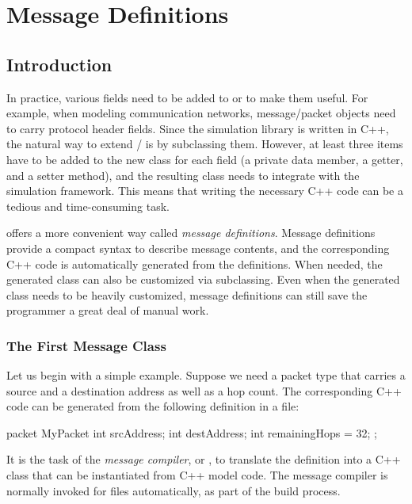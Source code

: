 \chapter{Message Definitions}
\label{cha:msg-def}


\section{Introduction}
\label{sec:msg-defs:intro}

In practice, various fields need to be added to  or
 to make them useful. For example, when modeling
communication networks, message/packet objects need to carry protocol
header fields. Since the simulation library is written in C++, the natural
way to extend / is by subclassing
them. However, at least three items have to be added to the new class for
each field (a private data member, a getter, and a setter method), and the
resulting class needs to integrate with the simulation framework. This
means that writing the necessary C++ code can be a tedious and
time-consuming task.

{\opp} offers a more convenient way called \textit{message definitions}.
Message definitions provide a compact syntax to describe message contents,
and the corresponding C++ code is automatically generated from the
definitions. When needed, the generated class can also be customized via
subclassing. Even when the generated class needs to be heavily customized,
message definitions can still save the programmer a great deal of manual
work.


\subsection{The First Message Class}
\label{sec:msg-defs:first-msg-class}

Let us begin with a simple example. Suppose we need a packet type that
carries a source and a destination address as well as a hop count. The
corresponding C++ code can be generated from the following definition in a
 file:

\begin{msg}
packet MyPacket
{
     int srcAddress;
     int destAddress;
     int remainingHops = 32;
};
\end{msg}

It is the task of the {\opp} \textit{message compiler},  or
, to translate the definition into a C++ class that can be
instantiated from C++ model code. The message compiler is normally invoked for
 files automatically, as part of the build process.

